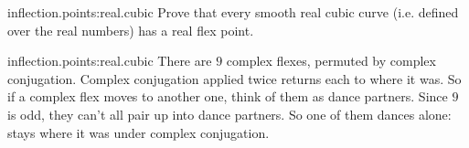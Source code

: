 \begin{problem}{inflection.points:real.cubic}
Prove that every smooth real cubic curve (i.e. defined over the real numbers) has a real flex point.
\end{problem}
\begin{answer}{inflection.points:real.cubic}
There are \(9\) complex flexes, permuted by complex conjugation.
Complex conjugation applied twice returns each to where it was.
So if a complex flex moves to another one, think of them as dance partners.
Since \(9\) is odd, they can't all pair up into dance partners.
So one of them dances alone: stays where it was under complex conjugation.
\end{answer}



